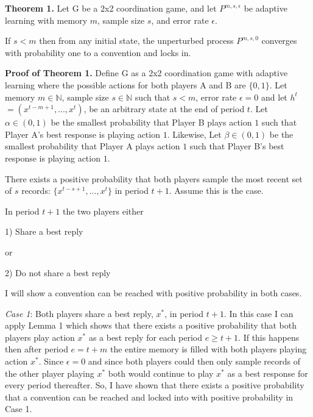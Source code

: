 \documentclass{article}
\begin{document}
\pagebreak

\textbf{Theorem 1.} Let G be a 2x2 coordination game, and let $P^{m,s,\epsilon}$ be adaptive learning with memory $m$, sample size $s$, and error rate $\epsilon$.

\vskip12pt

If $s < m$ then from any initial state, the unperturbed process $P^{m,s,0}$ converges with probability one to a convention and locks in.

\vskip24pt

\textbf{Proof of Theorem 1.} Define G as a 2x2 coordination game with adaptive learning where the possible actions for both players A and B are $\{0 ,1 \}$. Let memory $m \in \mathds{N}$, sample size $s \in \mathds{N}$ such that $s<m$, error rate $\epsilon = 0$ and let $h^t$ $= (x^{t-m+1},...,x^{t})$, be an arbitrary state at the end of period $t$. Let $\alpha \in (0,1)$ be the smallest probability that Player B plays action $1$ such that Player A's best response is playing action $1$. Likewise, Let $\beta \in (0,1)$ be the smallest probability that Player A plays action $1$ such that Player B's best response is playing action $1$. 

\vskip12pt

There exists a positive probability that both players sample the most recent set of $s$ records: $\{x^{t-s+1},...,x^{t}\}$ in period $t+1$. Assume this is the case.

\vskip12pt

In period $t+1$ the two players either

1) Share a best reply

or 

2) Do not share a best reply

I will show a convention can be reached with positive probability in both cases.

\textit{Case 1}: Both players share a best reply, $x^*$, in period $t+1$. In this case I can apply Lemma 1 which shows that there exists a positive probability that both players play action $x^*$ as a best reply for each period $e \geq t+1$. If this happens then after period $e=t+m$ the entire memory is filled with both players playing action $x^*$. Since $\epsilon=0$ and since both players could then only sample records of the other player playing $x^*$ both would continue to play $x^*$ as a best response for every period thereafter. So, I have shown that there exists a positive probability that a convention can be reached and locked into with positive probability in Case 1. 
\end{document}

